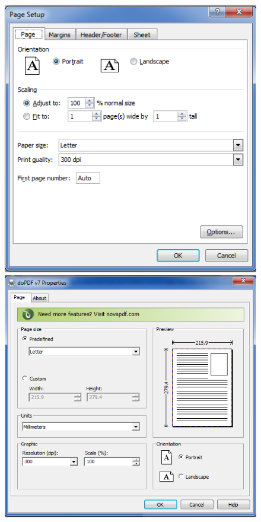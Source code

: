 \begin{figure}[H]
\centering
\includegraphics[scale=0.25]{src/images/chapter1/chapter1_fig48.png}\qquad
\includegraphics[scale=0.25]{src/images/chapter1/chapter1_fig49.png}
\end{figure}
	
